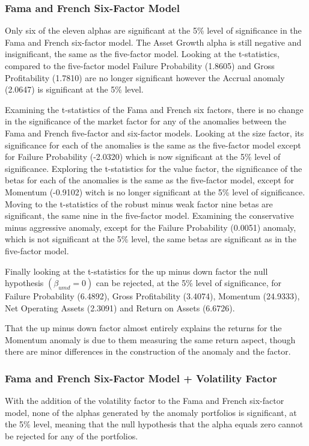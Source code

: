 \documentclass[12pt, a4paper, oneside]{article}
\begin{document}
\subsubsection{Fama and French Six-Factor Model}
Only six of the eleven alphas are significant at the 5\% level of significance in the Fama and French six-factor model. The Asset Growth alpha is still negative and insignificant, the same as the five-factor model. Looking at the t-statistics, compared to the five-factor model Failure Probability (1.8605) and Gross Profitability (1.7810) are no longer significant however the Accrual anomaly (2.0647) is significant at the 5\% level.

Examining the t-statistics of the Fama and French six factors, there is no change in the significance of the market factor for any of the anomalies between the Fama and French five-factor and six-factor models. Looking at the size factor, its significance for each of the anomalies is the same as the five-factor model except for Failure Probability (-2.0320) which is now significant at the 5\% level of significance. Exploring the t-statistics for the value factor, the significance of the betas for each of the anomalies is the same as the five-factor model, except for Momentum (-0.9102) witch is no longer significant at the 5\% level of significance. Moving to the t-statistics of the robust minus weak factor nine betas are significant, the same nine in the five-factor model. Examining the conservative minus aggressive anomaly, except for the Failure Probability (0.0051) anomaly, which is not significant at the 5\% level, the same betas are significant as in the five-factor model.

Finally looking at the t-statistics for the up minus down factor the null hypothesis $(\beta_{umd}= 0)$ can be rejected, at the 5\% level of significance, for Failure Probability (6.4892), Gross Profitability (3.4074), Momentum (24.9333), Net Operating Assets (2.3091) and Return on Assets (6.6726).

That the up minus down factor almost entirely explains the returns for the Momentum anomaly is due to them measuring the same return aspect, though there are minor differences in the construction of the anomaly and the factor.

\subsubsection{Fama and French Six-Factor Model + Volatility Factor}
With the addition of the volatility factor to the Fama and French six-factor model, none of the alphas generated by the anomaly portfolios is significant, at the 5\% level, meaning that the null hypothesis that the alpha equals zero cannot be rejected for any of the portfolios. 
\end{document}
